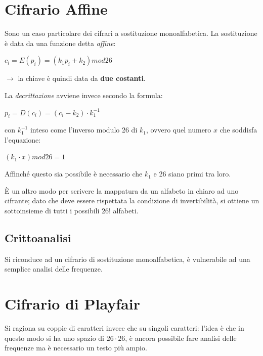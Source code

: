 \section{Cifrario Affine}

Sono un caso particolare dei cifrari a sostituzione monoalfabetica. La sostituzione 
è data da una funzione detta \textit{affine}:


\begin{center}
    $c_i = E(p_i) = (k_1p_i + k_2) mod 26$
\end{center}

$\rightarrow$ la chiave è quindi data da \textbf{due costanti}.

\noindent La \textit{decrittazione} avviene invece secondo la formula:

\begin{center}
    $p_i = D(c_i) = (c_i - k_2) \cdot k_1^{-1}$
\end{center}

\noindent con $k_1^{-1}$ inteso come l'inverso modulo 26 di $k_1$, ovvero quel numero 
$x$ che soddisfa l'equazione:

\begin{center}
    $(k_1 \cdot x) mod 26 = 1$
\end{center}

\noindent Affinché questo sia possibile è necessario che $k_1$ e 26 siano primi tra loro.

\noindent È un altro modo per scrivere la mappatura da un alfabeto in chiaro ad uno 
cifrante; dato che deve essere rispettata la condizione di invertibilità, si ottiene un 
sottoinsieme di tutti i possibili $26!$ alfabeti.

\subsection{Crittoanalisi}

Si riconduce ad un cifrario di sostituzione monoalfabetica, è vulnerabile ad una semplice analisi delle frequenze.

\section{Cifrario di Playfair}

Si ragiona su coppie di caratteri invece che su singoli caratteri: l'idea è che in 
questo modo si ha uno spazio di $26 \cdot 26$, è ancora possibile fare analisi delle frequenze
ma è necessario un testo più ampio.

